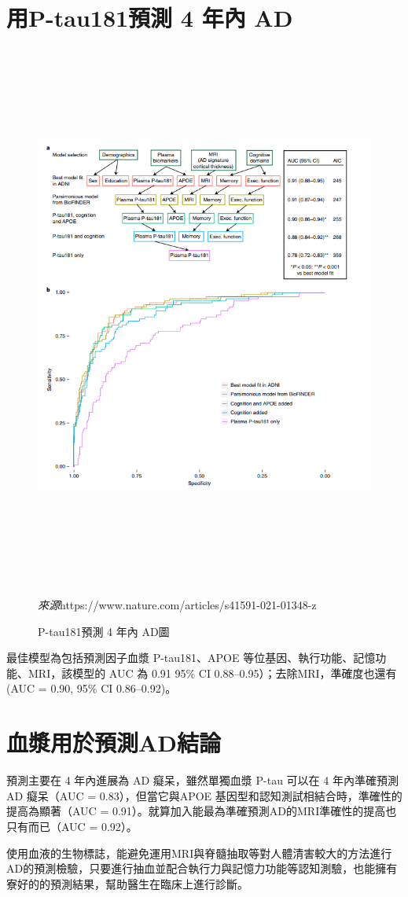 \section{用P-tau181預測 4 年內 AD }
\begin{figure}[H]
	\centering
	\centerline{\includegraphics[height=18cm]{pic/AD181.PNG}}
	\caption{P-tau181預測 4 年內 AD圖}
	\begin{minipage}{.7\linewidth}
		\centering
		\footnotesize
		\emph{來源}https://www.nature.com/articles/s41591-021-01348-z
	\end{minipage}
	\label{fig:AD181}
\end{figure}
最佳模型為包括預測因子血漿 P-tau181、APOE 等位基因、執行功能、記憶功能、MRI，該模型的 AUC 為 0.91 95\% CI 0.88–0.95）；去除MRI，準確度也還有 (AUC = 0.90, 95\% CI 0.86–0.92)。


\section{血漿用於預測AD結論}
預測主要在 4 年內進展為 AD 癡呆，雖然單獨血漿 P-tau 可以在 4 年內準確預測 AD 癡呆（AUC = 0.83），但當它與APOE 基因型和認知測試相結合時，準確性的提高為顯著（AUC = 0.91）。就算加入能最為準確預測AD的MRI準確性的提高也只有而已（AUC = 0.92）。

使用血液的生物標誌，能避免運用MRI與脊髓抽取等對人體清害較大的方法進行AD的預測檢驗，只要進行抽血並配合執行力與記憶力功能等認知測驗，也能擁有寮好的的預測結果，幫助醫生在臨床上進行診斷。
